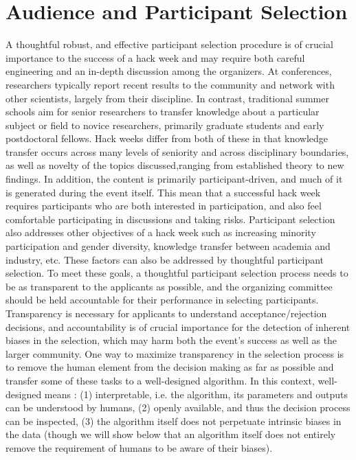 \section*{Audience and Participant Selection}

A thoughtful robust, and effective participant selection procedure is of crucial importance to the success of a hack week and may require both careful engineering and an in-depth discussion among the organizers.
At conferences, researchers typically report recent results to the community and network with other scientists, largely from their discipline.
In contrast, traditional summer schools aim for senior researchers to transfer knowledge about a particular subject or field to novice researchers, primarily graduate students and early postdoctoral fellows.
Hack weeks differ from both of these in that knowledge transfer occurs across many levels of seniority and across disciplinary boundaries, as well as novelty of the topics discussed,ranging from established theory to new findings.
In addition, the content is primarily participant-driven, and much of it is generated during the event itself.
This mean that a successful hack week requires participants who are both interested in participation, and also feel comfortable participating in discussions and taking risks.
Participant selection also addresses other objectives of a hack week such as increasing minority participation and gender diversity, knowledge transfer between academia and industry, etc. These factors can also be addressed by thoughtful participant selection.
To meet these goals, a thoughtful participant selection process needs to be as transparent to the applicants as possible, and the organizing committee should be held accountable for their performance in selecting participants.
Transparency is necessary for applicants to understand acceptance/rejection decisions, and accountability is of crucial importance for the detection of inherent biases in the selection, which may harm both the event's success as well as the larger community.
One way to maximize transparency in the selection process is to remove the human element from the decision making as far as possible and transfer some of these tasks to a well-designed algorithm.
In this context, well-designed means \cite{o2017weapons}: (1) interpretable, i.e. the algorithm, its parameters and outputs can be understood by humans, (2) openly available, and thus the decision process can be inspected, (3) the algorithm itself does not perpetuate intrinsic biases in the data (though we will show below that an algorithm itself does not entirely remove the requirement of humans to be aware of their biases).
